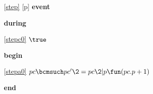 \noindent \ref{step} [p] \textbf{event}
\begin{block}
  \item   \textbf{during}
  \begin{block}
  \item[ \eqref{stepc0} ]$\true$ %
  \end{block}
  \item   \textbf{begin}
  \begin{block}
  \item[ \eqref{stepa0} ]$pc \bcmsuch pc' \2= pc \2| p \fun (pc.p + 1) $ %
  \end{block}
  \item   \textbf{end} \\
\end{block}
